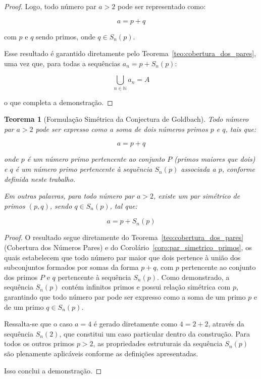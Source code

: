 \documentclass[a4paper,11pt]{article}
\newtheorem{theorem}{Teorema}[section]
\theoremstyle{definition}
\theoremstyle{remark}
\begin{document}
\begin{otherlanguage}{brazil}
\begin{proof}
		Logo, todo número par \(a > 2\) pode ser representado como:
		
		\[
		a = p + q
		\]
		
		com \(p\) e \(q\) sendo primos, onde \(q \in S_n(p)\).
		
		Esse resultado é garantido diretamente pelo Teorema~\ref{teo:cobertura_dos_pares}, uma vez que, para todas a sequências \(a_n = p + S_n(p) \):
		
		\[
		\bigcup_{n \in \mathbb{N}} a_n = A
		\]
		
		o que completa a demonstração. 
	\end{proof}
	
	
	\begin{theorem}[Formulação Simétrica da Conjectura de Goldbach]\label{teo:goldbach_por_simetria_de_primos}
		Todo número par \(a > 2\) pode ser expresso como a soma de dois números primos \(p\) e \(q\), tais que:
		
		\[
		a = p + q
		\]
		
		onde \(p\) é um número primo pertencente ao conjunto \(P\) (primos maiores que dois) e \(q\) é um número primo pertencente à sequência \(S_n(p)\) associada a \(p\), conforme definida neste trabalho.
		
		Em outras palavras, para todo número par \(a > 2\), existe um par simétrico de primos \((p, q)\), sendo \(q \in S_n(p)\), tal que:
		
		\[
		a = p + S_n(p)
		\]
	\end{theorem}
	\begin{proof}
	O resultado segue diretamente do Teorema~\ref{teo:cobertura_dos_pares} (Cobertura dos Números Pares) e do Corolário~\ref{coro:par_simetrico_primos}, os quais estabelecem que todo número par maior que dois pertence à união dos subconjuntos formados por somas da forma \(p + q\), com \(p\) pertencente ao conjunto dos primos \(P\) e \(q\) pertencente à sequência \(S_n(p)\). Como demonstrado, a sequência \(S_n(p)\) contém infinitos primos e possui relação simétrica com \(p\), garantindo que todo número par pode ser expresso como a soma de um primo \(p\) e de um primo \(q \in S_n(p)\).
	
	Ressalta-se que o caso \(a = 4\) é gerado diretamente como \(4 = 2 + 2\), através da sequência \(S_n(2)\), que constitui um caso particular dentro da construção. Para todos os outros primos \(p > 2\), as propriedades estruturais da sequência \(S_n(p)\) são plenamente aplicáveis conforme as definições apresentadas.
	
	Isso conclui a demonstração.
	\end{proof}
	

\end{otherlanguage}
\end{document}
